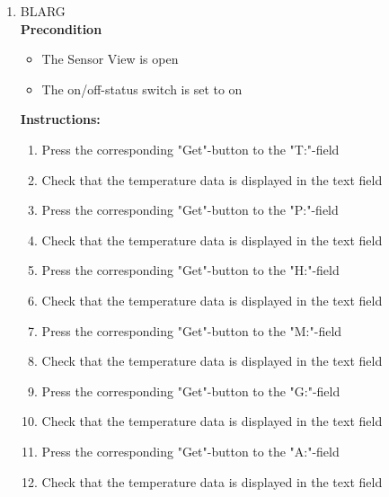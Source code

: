 \documentclass[a4paper]{article}
\newlength{\testlabellength}
\newenvironment{testlist}{\begin{enumerate}[label=\bfseries Instruction \thesubsection.\arabic* , labelindent=0pt, labelwidth=\testlabellength , leftmargin=2cm]}{\end{enumerate}}
\newenvironment{precondition}{
{\color{white}BLARG}\\ 
\textbf{Precondition}
\begin{itemize}[labelindent=0cm, labelwidth=2cm , leftmargin=1cm]
}
{\end{itemize}}
\newenvironment{instruction}{
\textbf{Instructions:}
\begin{enumerate}[label=\bfseries  \arabic*., labelindent=0cm, labelwidth=2cm , leftmargin=1cm]
}
{\end{enumerate}}
\newenvironment{postcondition}{
\textbf{Postcondition:}
\begin{itemize}[labelindent=0cm, labelwidth=2cm , leftmargin=1cm]
}
{\end{itemize}}
\begin{document}
\begin{appendices}
\begin{testlist}
	\item	\label{SensorTest2}
		\begin{precondition}
			\item The Sensor View is open
			\item The on/off-status switch is set to on
		\end{precondition}
		\begin{instruction}
			\item Press the corresponding "Get"-button to the "T:"-field
			\item Check that the temperature data is displayed in the text field
			\item Press the corresponding "Get"-button to the "P:"-field
			\item Check that the temperature data is displayed in the text field
			\item Press the corresponding "Get"-button to the "H:"-field
			\item Check that the temperature data is displayed in the text field
			\item Press the corresponding "Get"-button to the "M:"-field
			\item Check that the temperature data is displayed in the text field
			\item Press the corresponding "Get"-button to the "G:"-field
			\item Check that the temperature data is displayed in the text field
			\item Press the corresponding "Get"-button to the "A:"-field
			\item Check that the temperature data is displayed in the text field
		\end{instruction}




\end{testlist}
\end{appendices}
\end{document}
